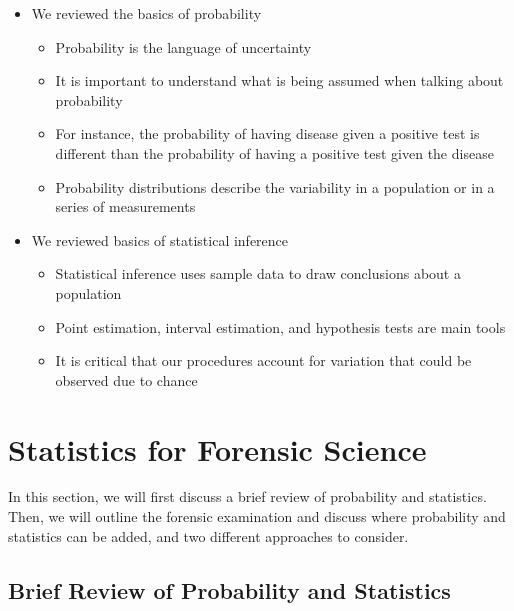 \documentclass[]{book}
\providecommand{\tightlist}{%
  \setlength{\itemsep}{0pt}\setlength{\parskip}{0pt}}
\theoremstyle{definition}
\theoremstyle{definition}
\theoremstyle{remark}
\begin{document}
\begin{itemize}
\tightlist
\item
  We reviewed the basics of probability

  \begin{itemize}
  \tightlist
  \item
    Probability is the language of uncertainty
  \item
    It is important to understand what is being assumed when talking
    about probability
  \item
    For instance, the probability of having disease given a positive
    test is different than the probability of having a positive test
    given the disease
  \item
    Probability distributions describe the variability in a population
    or in a series of measurements
  \end{itemize}
\item
  We reviewed basics of statistical inference

  \begin{itemize}
  \tightlist
  \item
    Statistical inference uses sample data to draw conclusions about a
    population
  \item
    Point estimation, interval estimation, and hypothesis tests are main
    tools
  \item
    It is critical that our procedures account for variation that could
    be observed due to chance
  \end{itemize}
\end{itemize}

\chapter{Statistics for Forensic
Science}\label{statistics-for-forensic-science}

In this section, we will first discuss a brief review of probability and
statistics. Then, we will outline the forensic examination and discuss
where probability and statistics can be added, and two different
approaches to consider.

\section{Brief Review of Probability and
Statistics}\label{brief-review-of-probability-and-statistics}
\end{document}
